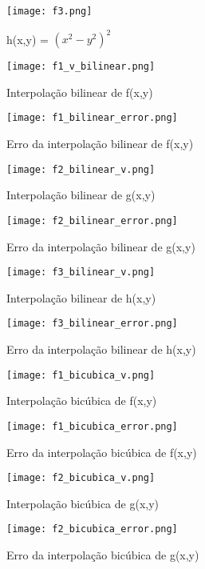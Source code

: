 \documentclass[a4paper, 12pt]{article}
\begin{document}
\begin{figure}[!htp]
\centering
\texttt{[image: f3.png]}
\caption{h(x,y) = $(x^2 - y^2)^2$}
\end{figure}

\begin{figure}[!htp]
\centering
\texttt{[image: f1\_v\_bilinear.png]}
\caption{Interpolação bilinear de f(x,y)}
\end{figure}

\begin{figure}[!htp]
\centering
\texttt{[image: f1\_bilinear\_error.png]}
\caption{Erro da interpolação bilinear de f(x,y)}
\end{figure}

\begin{figure}[!htp]
\centering
\texttt{[image: f2\_bilinear\_v.png]}
\caption{Interpolação bilinear de g(x,y)}
\end{figure}

\begin{figure}[!htp]
\centering
\texttt{[image: f2\_bilinear\_error.png]}
\caption{Erro da interpolação bilinear de g(x,y)}
\end{figure}

\begin{figure}[!htp]
\centering
\texttt{[image: f3\_bilinear\_v.png]}
\caption{Interpolação bilinear de h(x,y)}
\end{figure}

\begin{figure}[!htp]
\centering
\texttt{[image: f3\_bilinear\_error.png]}
\caption{Erro da interpolação bilinear de h(x,y)}
\end{figure}

\begin{figure}[!htp]
\centering
\texttt{[image: f1\_bicubica\_v.png]}
\caption{Interpolação bicúbica de f(x,y)}
\end{figure}

\begin{figure}[!htp]
\centering
\texttt{[image: f1\_bicubica\_error.png]}
\caption{Erro da interpolação bicúbica de f(x,y)}
\end{figure}

\begin{figure}[!htp]
\centering
\texttt{[image: f2\_bicubica\_v.png]}
\caption{Interpolação bicúbica de g(x,y)}
\end{figure}

\begin{figure}[!htp]
\centering
\texttt{[image: f2\_bicubica\_error.png]}
\caption{Erro da interpolação bicúbica de g(x,y)}
\end{figure}
\end{document}
